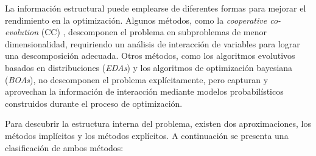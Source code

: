 La información estructural puede emplearse de diferentes formas para mejorar el rendimiento en la optimización. Algunos métodos, como la \textit{cooperative co-evolution} (CC) \cite{CC}, descomponen el problema en subproblemas de menor dimensionalidad, requiriendo un análisis de interacción de variables para lograr una descomposición adecuada. Otros métodos, como los algoritmos evolutivos basados en distribuciones (\textit{EDAs}) y los algoritmos de optimización bayesiana (\textit{BOAs}), no descomponen el problema explícitamente, pero capturan y aprovechan la información de interacción mediante modelos probabilísticos construidos durante el proceso de optimización.


Para descubrir la estructura interna del problema, existen dos aproximaciones, los métodos implícitos y los métodos explícitos. A continuación se presenta una clasificación de ambos métodos:

